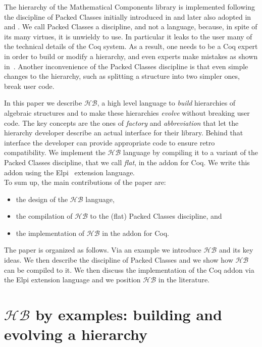 \documentclass[a4paper,UKenglish,cleveref, autoref]{lipics-v2019}
\newcommand{\HB}{\ensuremath{\mathcal{HB}}}
\newcommand{\hb}{\coq{hierarchy-builder}}
\newcommand{\factory}{factory}
\newcommand{\phantterm}{abbreviation}
\theoremstyle{implem}
\theoremstyle{implem}
\theoremstyle{command}
\begin{document}
The hierarchy of the Mathematical Components library
is implemented following the discipline of Packed Classes initially introduced
in \cite{DBLP:conf/tphol/GarillotGMR09} and later also adopted in
\cite{DBLP:conf/mpc/AffeldtNS19} and \cite{DBLP:journals/mics/BoldoLM15}.
We call Packed Classes a discipline, and not a language, because, in spite of
its many virtues, it is unwieldy to use. In particular it leaks to the user
many of the technical details of the Coq system. As a result, one
needs to be a Coq expert in order to build or modify a hierarchy, and even
experts make mistakes as shown in~\cite{KSdraft}.
Another inconvenience of the Packed Classes discipline is that even
simple changes to the hierarchy, such as splitting a structure into
two simpler ones, break user code.

In this paper we describe \HB{}, a high level language
to \emph{build} hierarchies of algebraic structures and to make these hierarchies
\emph{evolve} without breaking user code. The key concepts are the ones of
\emph{\factory{}} and \emph{\phantterm{}} that let the hierarchy developer describe an actual
interface for their library. Behind that interface the developer can provide
appropriate code to ensure retro compatibility.
We implement the \HB{} language by compiling it
to a variant of the Packed Classes discipline, that we call \emph{flat},
in the \hb{} addon for Coq. We write this addon using the
Elpi~\cite{DBLP:conf/lpar/DunchevGCT15,CoqElpi} extension language.\\

\noindent To sum up, the main contributions of the paper are:
\begin{itemize}
\item the design of the \HB{} language,
\item the compilation of \HB{} to the (flat) Packed Classes discipline, and
\item the implementation of \HB{} in the \hb{} addon for Coq.
\end{itemize}
The paper is organized as follows. Via an example we introduce
\HB{} and its key ideas. %
We then describe the discipline
of Packed Classes and we show how \HB{} can be compiled to it.
We then discuss the implementation of the Coq addon via the Elpi extension
language and we position \HB{} in the literature.

\section{\HB{} by examples: building and evolving a hierarchy}
\label{sec:example}
\end{document}
